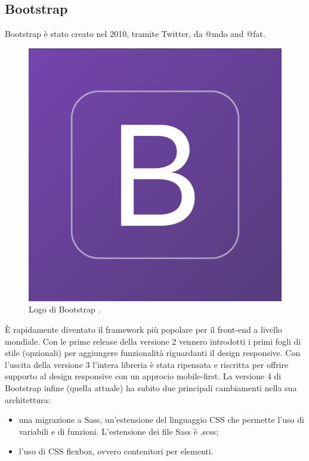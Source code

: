 \subsection{Bootstrap}
\noindent Bootstrap è stato creato nel 2010, tramite Twitter, da @mdo and @fat.
\begin{figure}[H]
    \centering
    \includegraphics[width=0.3\linewidth]{img/bootstrap-logo.png}
    \caption{Logo di Bootstrap \cite{bootstrap}.}
    \label{bootstrapLogo}
\end{figure}
\noindent È rapidamente diventato il framework più popolare per il front-end a livello mondiale.
Con le prime release della versione 2 vennero introdotti i primi fogli di stile (opzionali) per aggiungere funzionalità riguardanti il design responsive.\newline
Con l'uscita della versione 3 l'intera libreria è stata ripensata e riscritta per offrire supporto al design responsive con un approcio mobile-first.
La versione 4 di Bootstrap infine (quella attuale) ha subito due principali cambiamenti nella sua architettura:
\begin{itemize}
    \item una migrazione a Sass, un'estensione del linguaggio CSS che permette l'uso di variabili e di funzioni. L'estensione dei file Sass è .scss;
    \item l'uso di CSS flexbox, ovvero contenitori per elementi.
\end{itemize}

